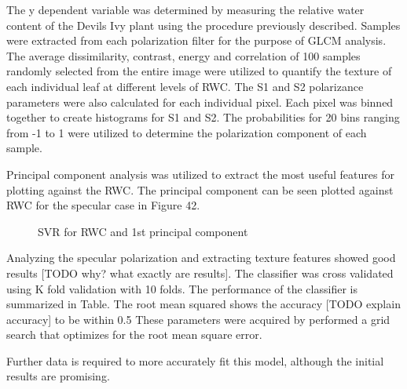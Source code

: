 The y dependent variable was determined by measuring the relative water content of the Devils Ivy plant using the procedure previously described.  Samples were extracted from each polarization filter for the purpose of GLCM analysis.  The average dissimilarity, contrast, energy and correlation of 100 samples randomly selected from the entire image were utilized to quantify the texture of each individual leaf at different levels of RWC.  The S1 and S2 polarizance parameters were also calculated for each individual pixel. Each pixel was binned together to create histograms for S1 and S2.  The probabilities for 20 bins ranging from -1 to 1 were utilized to determine the polarization component of each sample.

Principal component analysis was utilized to extract the most useful features for plotting against the RWC.  The principal component can be seen plotted against RWC for the specular case in Figure 42.
%
\begin{figure}[!htb]
    \begin{center}
    \end{center}
    \caption{SVR for RWC and 1st principal component}
    \label{fig:polarization}
\end{figure}
%
Analyzing the specular polarization and extracting texture features showed good results [TODO why? what exactly are results].  The classifier was cross validated using K fold validation with 10 folds.  The performance of the classifier is summarized in Table.
The root mean squared shows the accuracy [TODO explain accuracy] to be within 0.5%
These parameters were acquired by performed a grid search that optimizes for the root mean square error.

Further data is required to more accurately fit this model, although the initial results are promising.
